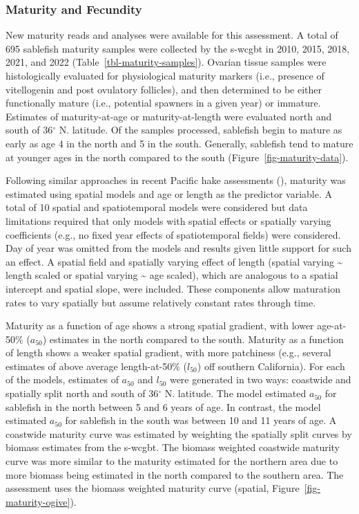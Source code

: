 \documentclass[
  english,
]{article}
\begin{document}
\subsubsection{Maturity and Fecundity}\label{mat-fecund}

New maturity reads and analyses were available for this assessment. A
total of 695 sablefish maturity samples were collected by the
\gls{s-wcgbt} in 2010, 2015, 2018, 2021, and 2022
(Table~\ref{tbl-maturity-samples}). Ovarian tissue samples were
histologically evaluated for physiological maturity markers (i.e.,
presence of vitellogenin and post ovulatory follicles), and then
determined to be either functionally mature (i.e., potential spawners in
a given year) or immature. Estimates of maturity-at-age or
maturity-at-length were evaluated north and south of 36\(^\circ\) N.
latitude. Of the samples processed, sablefish begin to mature as early
as age 4 in the north and 5 in the south. Generally, sablefish tend to
mature at younger ages in the north compared to the south
(Figure~\ref{fig-maturity-data}).

Following similar approaches in recent Pacific hake assessments
(), maturity was estimated
using spatial models and age or length as the predictor variable. A
total of 10 spatial and spatiotemporal models were considered but data
limitations required that only models with spatial effects or spatially
varying coefficients (e.g., no fixed year effects of spatiotemporal
fields) were considered. Day of year was omitted from the models and
results given little support for such an effect. A spatial field and
spatially varying effect of length (spatial varying \textasciitilde{}
length scaled or spatial varying \textasciitilde{} age scaled), which
are analogous to a spatial intercept and spatial slope, were included.
These components allow maturation rates to vary spatially but assume
relatively constant rates through time.

Maturity as a function of age shows a strong spatial gradient, with
lower age-at-50\% (\(a_{50}\)) estimates in the north compared to the
south. Maturity as a function of length shows a weaker spatial gradient,
with more patchiness (e.g., several estimates of above average
length-at-50\% (\(l_{50}\)) off southern California). For each of the
models, estimates of \(a_{50}\) and \(l_{50}\) were generated in two
ways: coastwide and spatially split north and south of 36\(^\circ\) N.
latitude. The model estimated \(a_{50}\) for sablefish in the north
between 5 and 6 years of age. In contrast, the model estimated
\(a_{50}\) for sablefish in the south was between 10 and 11 years of
age. A coastwide maturity curve was estimated by weighting the spatially
split curves by biomass estimates from the \gls{s-wcgbt}. The biomass
weighted coastwide maturity curve was more similar to the maturity
estimated for the northern area due to more biomass being estimated in
the north compared to the southern area. The assessment uses the biomass
weighted maturity curve (spatial, Figure~\ref{fig-maturity-ogive}).
\end{document}
